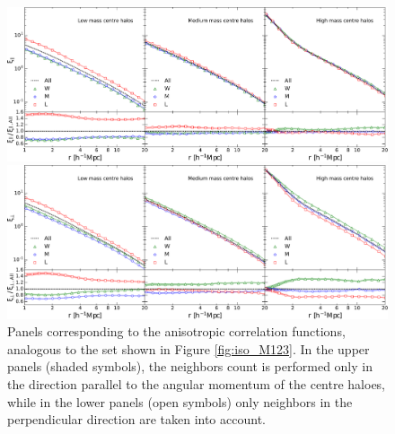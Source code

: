 \documentclass[fleqn,usenatbib]{mnras}
\begin{document}
\begin{figure}
	\includegraphics[width=2\columnwidth]{400Mpc_figs/panel_M123_ani00_color.pdf}

    \vspace{0.3cm}
    \includegraphics[width=2\columnwidth]{400Mpc_figs/panel_M123_ani90_color.pdf}
    \caption{Panels corresponding to the anisotropic correlation functions, analogous to the set shown in Figure \ref{fig:iso_M123}. In the upper panels (shaded symbols), the neighbors count is performed only in the direction parallel to the angular momentum of the centre haloes, while in the lower panels (open symbols) only neighbors in the perpendicular direction are taken into account.}
    \label{fig:ani_M123}
\end{figure}
\end{document}
